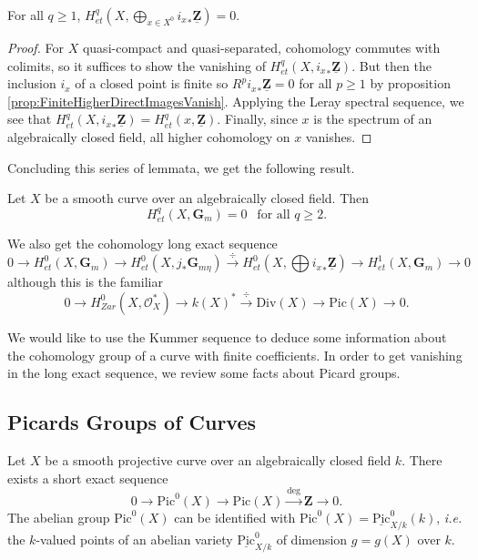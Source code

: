 \begin{lemma}
For all $q \geq 1$, $H_{et}^q(X, \bigoplus_{x \in X^0} {i_x}_* \underline{\mathbf{Z}}) = 0$.
\end{lemma}

\begin{proof}
For $X$ quasi-compact and quasi-separated, cohomology commutes with colimits, so it suffices to show the vanishing of $H_{et}^q(X, {i_x}_* \underline{\mathbf{Z}})$. But then the inclusion $i_x$ of a closed point is finite so $R^p {i_x}_* \underline{\mathbf{Z}} = 0$ for all $p \geq 1$ by proposition \ref{prop:FiniteHigherDirectImagesVanish}. Applying the Leray spectral sequence, we see that $H_{et}^q(X, {i_x}_* \underline{\mathbf{Z}}) = H_{et}^q(x, \underline{\mathbf{Z}})$. Finally, since $x$ is the spectrum of an algebraically closed field, all higher cohomology on $x$ vanishes.
\end{proof}

Concluding this series of lemmata, we get the following result.

\begin{theorem}
Let $X$ be a smooth curve over an algebraically closed field. Then 
$$
H_{et}^q(X, \mathbf{G}_m) = 0 \ \ \text{ for all } q \geq 2.
$$
\end{theorem}

We also get the cohomology long exact sequence
$$
0 \to H_{et}^0(X,\mathbf{G}_m) \to H_{et}^0(X,j_*\mathbf{G}_{m\eta}) \xrightarrow{\div} H_{et}^0(X,\bigoplus {i_x}_*\underline{\mathbf{Z}}) \to H_{et}^1(X,\mathbf{G}_m) \to 0
$$
although this is the familiar
$$
0 \to H_{Zar}^0(X,\mathcal{O}_X^*) \to k(X)^* \xrightarrow{\div} \text{Div}(X) \to \text{Pic}(X) \to 0.
$$

We would like to use the Kummer sequence to deduce some information about the cohomology group of a curve with finite coefficients. In order to get vanishing in the long exact sequence, we review some facts about Picard groups.

\subsection{Picards Groups of Curves}

Let $X$ be a smooth projective curve over an algebraically closed field $k$. There exists a short exact sequence
$$
0\to \text{Pic}^0(X) \to  \text{Pic}(X)\xrightarrow{\deg} \mathbf{Z} \to 0.
$$
The abelian group $\text{Pic}^0(X)$ can be identified with $\text{Pic}^0(X) = \underline{\text{Pic}}^0_{X/k}(k)$, {\it i.e.} the $k$-valued points of an abelian variety $\underline{\text{Pic}}^0_{X/k}$ of dimension $g=g(X)$ over $k$. 

